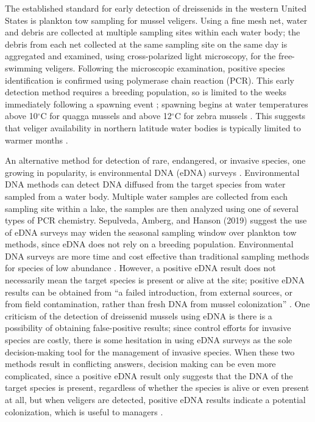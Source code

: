 \documentclass[12pt]{article}\usepackage[]{graphicx}\usepackage[]{color}
\begin{document}
The established standard for early detection of dreissenids in the western United States is plankton tow sampling for mussel veligers. Using a fine mesh net, water and debris are collected at multiple sampling sites within each water body; the debris from each net collected at the same sampling site on the same day is aggregated and examined, using cross-polarized light microscopy, for the free-swimming veligers. Following the microscopic examination, positive species identification is confirmed using polymerase chain reaction (PCR). This early detection method requires a breeding population, so is limited to the weeks immediately following a spawning event \cite{Nichols}; spawning begins at water temperatures above 10$^\circ$C for quagga mussels and above 12$^\circ$C for zebra mussels \cite{McMahon, Mills}. This suggests that veliger availability in northern latitude water bodies is typically limited to warmer months \cite{Sepulveda:eDNA}.

An alternative method for detection of rare, endangered, or invasive species, one growing in popularity, is environmental DNA (eDNA) surveys \cite{Schmelzle}. Environmental DNA methods can detect DNA diffused from the target species from water sampled from a water body. Multiple water samples are collected from each sampling site within a lake, the samples are then analyzed using one of several types of PCR chemistry. Sepulveda, Amberg, and Hanson (2019) suggest the use of eDNA surveys may widen the seasonal sampling window over plankton tow methods, since eDNA does not rely on a breeding population. Environmental DNA surveys are more time and cost effective than traditional sampling methods for species of low abundance \cite{Rees}. However, a positive eDNA result does not necessarily mean the target species is present or alive at the site; positive eDNA results can be obtained from ``a failed introduction, from external sources, or from field contamination, rather than fresh DNA from mussel colonization'' \cite{Sepulveda:eDNA}. One criticism of the detection of dreissenid mussels using eDNA is there is a possibility of obtaining false-positive results; since control efforts for invasive species are costly, there is some hesitation in using eDNA surveys as the sole decision-making tool for the management of invasive species. When these two methods result in conflicting answers, decision making can be even more complicated, since a positive eDNA result only suggests that the DNA of the target species is present, regardless of whether the species is alive or even present at all, but when veligers are detected, positive eDNA results indicate a potential colonization, which is useful to managers \cite{Holser:body}. 
\end{document}
